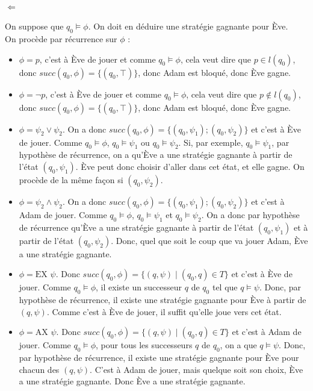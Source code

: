 \documentclass[10pt,a4paper]{article}
\begin{document}
\paragraph{$\Longleftarrow$}
On suppose que $q_0 \vDash \phi$. On doit en déduire une stratégie gagnante pour Ève.\\
On procède par récurrence sur $\phi$ :
\begin{itemize}
\item $\phi = p$, c'est à Ève de jouer et comme $q_0 \vDash \phi$, cela veut dire que $p \in l(q_0)$, donc $succ(q_0,\phi) = \{(q_0, \top)\}$, donc Adam est bloqué, donc Ève gagne.
\item $\phi = \neg p$, c'est à Ève de jouer et comme $q_0 \vDash \phi$, cela veut dire que $p \notin l(q_0)$, donc $succ(q_0,\phi) = \{(q_0, \top)\}$, donc Adam est bloqué, donc Ève gagne.

\item $\phi = \psi_2 \lor \psi_2$. On a donc $succ(q_0,\phi) = \{(q_0, \psi_1); (q_0, \psi_2) \}$ et c'est à Ève de jouer. Comme $q_0 \vDash \phi$, $q_0 \vDash \psi_1$ ou $q_0 \vDash \psi_2$. Si, par exemple, $q_0 \vDash \psi_1$, par hypothèse de récurrence, on a qu'Ève a une stratégie gagnante à partir de l'état $(q_0, \psi_1)$. Ève peut donc choisir d'aller dans cet état, et elle gagne. On procède de la même façon si $(q_0, \psi_2)$.

\item $\phi = \psi_2 \land \psi_2$. On a donc $succ(q_0,\phi) = \{(q_0, \psi_1); (q_0, \psi_2) \}$ et c'est à Adam de jouer. Comme $q_0 \vDash \phi$, $q_0 \vDash \psi_1$ et $q_0 \vDash \psi_2$. On a donc par hypothèse de récurrence qu'Ève a une stratégie gagnante à partir de l'état $(q_0, \psi_1)$ et à partir de l'état $(q_0, \psi_2)$. Donc, quel que soit le coup que va jouer Adam, Ève a une stratégie gagnante.

\item $\phi = \mbox{EX } \psi$. Donc $succ(q_0, \phi) = \{ (q, \psi) \mid (q_0,q) \in T \} $ et c'est à Ève de jouer. Comme $q_0 \vDash \phi$, il existe un successeur $q$ de $q_0$ tel que $q \vDash \psi$. Donc, par hypothèse de récurrence, il existe une stratégie gagnante pour Ève à partir de $(q, \psi)$. Comme c'est à Ève de jouer, il suffit qu'elle joue vers cet état.

\item $\phi = \mbox{AX } \psi$. Donc $succ(q_0, \phi) = \{ (q, \psi) \mid (q_0,q) \in T \} $ et c'est à Adam de jouer. Comme $q_0 \vDash \phi$, pour tous les successeurs $q$ de $q_0$, on a que $q \vDash \psi$. Donc, par hypothèse de récurrence, il existe une stratégie gagnante pour Ève pour chacun des $(q, \psi)$. C'est à Adam de jouer, mais quelque soit son choix, Ève a une stratégie gagnante. Donc Ève a une stratégie gagnante.


\end{itemize}
\end{document}
